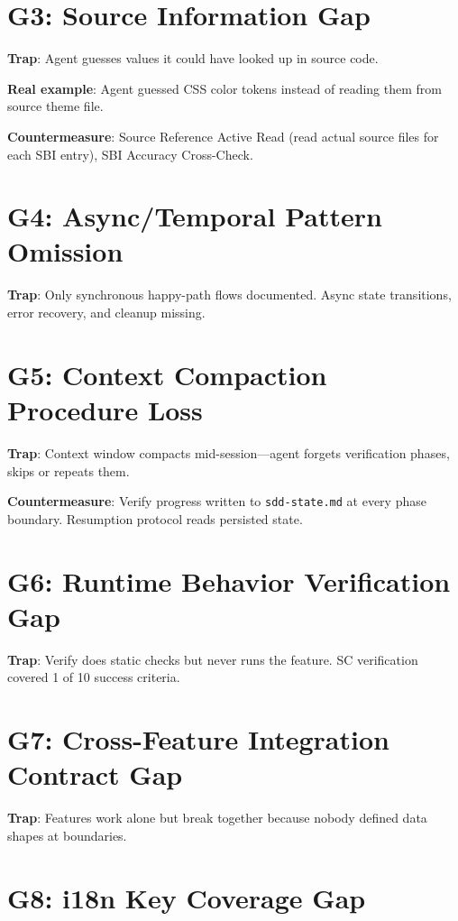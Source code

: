 \documentclass[11pt,a4paper,openright,twoside]{report}
\newcommand{\file}[1]{\texttt{#1}}
\begin{document}
\section{G3: Source Information Gap}

\textbf{Trap}: Agent guesses values it could have looked up in source code.

\textbf{Real example}: Agent guessed CSS color tokens instead of reading them from source theme file.

\textbf{Countermeasure}: Source Reference Active Read (read actual source files for each SBI entry), SBI Accuracy Cross-Check.

\section{G4: Async/Temporal Pattern Omission}

\textbf{Trap}: Only synchronous happy-path flows documented. Async state transitions, error recovery, and cleanup missing.

\section{G5: Context Compaction Procedure Loss}

\textbf{Trap}: Context window compacts mid-session---agent forgets verification phases, skips or repeats them.

\textbf{Countermeasure}: Verify progress written to \file{sdd-state.md} at every phase boundary. Resumption protocol reads persisted state.

\section{G6: Runtime Behavior Verification Gap}

\textbf{Trap}: Verify does static checks but never runs the feature. SC verification covered 1 of 10 success criteria.

\section{G7: Cross-Feature Integration Contract Gap}

\textbf{Trap}: Features work alone but break together because nobody defined data shapes at boundaries.

\section{G8: i18n Key Coverage Gap}
\end{document}
